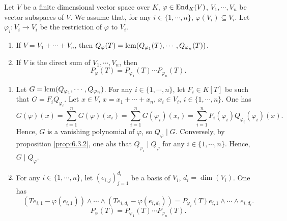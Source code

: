 \begin{propositionenv}\label{prop:6.3.4}
    Let $V$ be a finite dimensional vector space over $K$,
    $\varphi \in \operatorname{\mathrm{End}}_{K}(V)$,
    $V_1,\cdots,V_n$ be vector subspaces of $V$.
    We assume that, for any $i \in \{1,\cdots,n\}$, $\varphi(V_i) \subseteq V_{i}$.
    Let $\varphi_i:V_i \rightarrow V_i$ be the restriction of $\varphi$ to $V_i$.
    \begin{enumerate}
        \item If $V = V_1 + \cdots + V_n$, then $Q_{\varphi} (T) = \operatorname{\mathrm{lcm}}(Q_{\varphi_1}(T), \cdots, Q_{\varphi_n}(T))$.
        \item If $V$ is the direct sum of $V_1,\cdots,V_n$, then 
            $$P_{\varphi}(T) = P_{\varphi_1}(T) \cdots P_{\varphi_n}(T).$$
    \end{enumerate}
\end{propositionenv}
\begin{proofenv}
    \quad
    \begin{enumerate}
        \item Let $G = \operatorname{\mathrm{lcm}}(Q_{\varphi_1}, \cdots, Q_{\varphi_n})$.
            For any $i \in \{1,\cdots,n\}$,
            let $F_i \in K[T]$ be such that $G = F_{i} Q_{\varphi_i}$.
            Let $x \in V$, $x = x_1 + \cdots + x_n$, $x_i \in V_i$, $i \in \{1,\cdots,n\}$.
            One has
            $$G(\varphi)(x) = \sum_{i=1}^{n} G(\varphi)(x_i) = \sum_{i=1}^{n} G(\varphi_i)(x_i) = \sum_{i=1}^{n} F_i (\varphi_i) Q_{\varphi_i}(\varphi_i)(x).$$
            Hence, $G$ is a vanishing polynomial of $\varphi$, so $Q_\varphi \mid G$.
            Conversely, by proposition \ref{prop:6.3.2}, one ahs that $Q_{\varphi_i} \mid Q_{\varphi}$ for any $i \in \{1,\cdots,n\}$.
            Hence, $G \mid Q_{\varphi}$.
        \item For any $i \in \{1,\cdots,n\}$, let $(e_{i,j})_{j=1}^{d_i}$ be a basis of $V_i$, $d_i = \dim(V_i)$.
            One has
            $$(Te_{i,1} - \varphi(e_{i,1})) \wedge \cdots \wedge (Te_{i,d_i} - \varphi(e_{i,d_i})) = P_{\varphi_i} (T) e_{i,1} \wedge \cdots \wedge e_{i,d_i}.$$
            $$P_{\varphi}(T) = P_{\varphi_{1}}(T) \cdots P_{\varphi_{n}}(T).$$
    \end{enumerate}
\end{proofenv}

